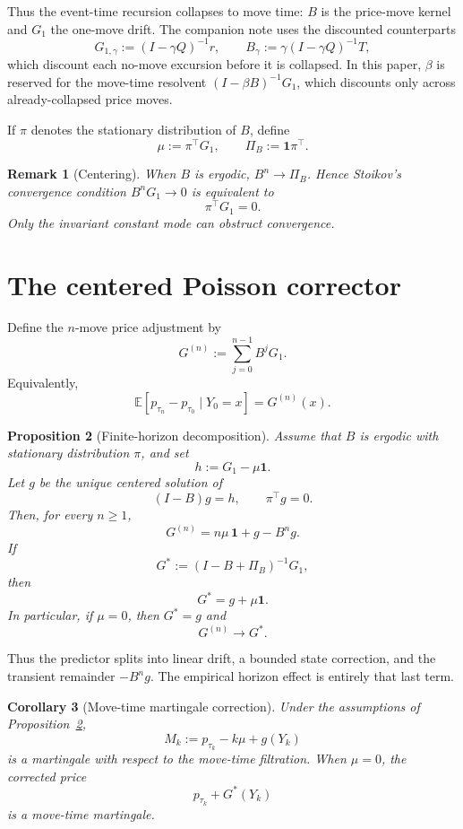 \documentclass[11pt]{article}
\theoremstyle{plain}
\newtheorem{proposition}{Proposition}[section]
\newtheorem{corollary}[proposition]{Corollary}
\newtheorem{remark}[proposition]{Remark}
\newcommand{\1}{\mathbf{1}}
\newcommand{\E}{\mathbb{E}}
\newcommand{\PiB}{\Pi_B}
\begin{document}
Thus the event-time recursion collapses to move time: $B$ is the price-move kernel and $G_1$ the one-move drift. The companion note uses the discounted counterparts
\[
G_{1,\gamma}:=(I-\gamma Q)^{-1}r,
\qquad
B_\gamma:=\gamma(I-\gamma Q)^{-1}T,
\]
which discount each no-move excursion before it is collapsed. In this paper, $\beta$ is reserved for the move-time resolvent $(I-\beta B)^{-1}G_1$, which discounts only across already-collapsed price moves.

If $\pi$ denotes the stationary distribution of $B$, define
\[
\mu:=\pi^\top G_1,
\qquad
\PiB:=\1\pi^\top.
\]

\begin{remark}[Centering]
When $B$ is ergodic, $B^n\to \PiB$. Hence Stoikov's convergence condition $B^nG_1\to 0$ is equivalent to
\[
\pi^\top G_1=0.
\]
Only the invariant constant mode can obstruct convergence.
\end{remark}

\section{The centered Poisson corrector}

Define the $n$-move price adjustment by
\[
G^{(n)}:=\sum_{j=0}^{n-1}B^jG_1.
\]
Equivalently,
\[
\E[p_{\tau_n}-p_{\tau_0}\mid Y_0=x]=G^{(n)}(x).
\]

\begin{proposition}[Finite-horizon decomposition]\label{prop:finite}
Assume that $B$ is ergodic with stationary distribution $\pi$, and set
\[
h:=G_1-\mu\1.
\]
Let $g$ be the unique centered solution of
\[
(I-B)g=h,
\qquad
\pi^\top g=0.
\]
Then, for every $n\ge 1$,
\[
G^{(n)}=n\mu\,\1+g-B^n g.
\]
If
\[
G^*:=(I-B+\PiB)^{-1}G_1,
\]
then
\[
G^*=g+\mu\1.
\]
In particular, if $\mu=0$, then $G^*=g$ and
\[
G^{(n)}\to G^*.
\]
\end{proposition}

Thus the predictor splits into linear drift, a bounded state correction, and the transient remainder $-B^n g$. The empirical horizon effect is entirely that last term.

\begin{corollary}[Move-time martingale correction]\label{cor:mart}
Under the assumptions of Proposition~\ref{prop:finite},
\[
M_k:=p_{\tau_k}-k\mu+g(Y_k)
\]
is a martingale with respect to the move-time filtration. When $\mu=0$, the corrected price
\[
p_{\tau_k}+G^*(Y_k)
\]
is a move-time martingale.
\end{corollary}
\end{document}
